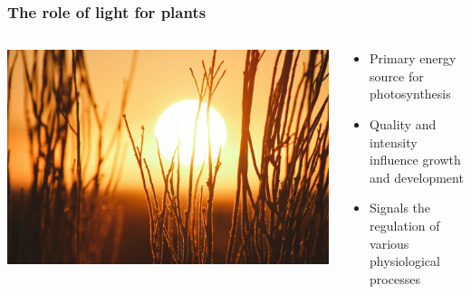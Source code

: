 \documentclass[
    12pt,
    aspectratio=1610,
    b,
    bibliography=../bibliography.bib,
    link-citations]{beamer}
\begin{document}
    \begin{frame}
        \frametitle{The role of light for plants}
        \begin{columns}[T]
            \begin{column}{.55\textwidth}
                \includegraphics[width=\linewidth]{jeremy-bishop-EdSdhvPX36M-unsplash}
            \end{column}
            \begin{column}{.45\textwidth}
                \begin{itemize}
                    \item Primary energy source for photosynthesis
                    \item Quality and intensity influence growth and development
                    \item Signals the regulation of various physiological processes
                \end{itemize}
                \quad \autocite{eichhorn_bilodeau_update_2019}
            \end{column}
        \end{columns}
    \end{frame}
\end{document}
